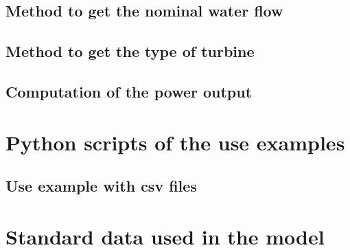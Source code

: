 \section{Method to get the nominal water flow}
\label{app:get_dV_n}



\section{Method to get the type of turbine}
\label{app:get_turb_type}



\section{Computation of the power output}
\label{app:powout}



\chapter{Python scripts of the use examples}

\section{Use example with csv files}
\label{app:ex_with_csv}




\chapter{Standard data used in the model}

